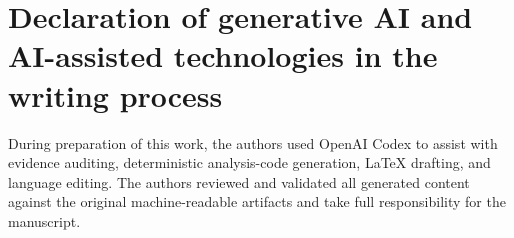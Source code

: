 \documentclass[preprint,12pt]{elsarticle}
\begin{document}
\section*{Declaration of generative AI and AI-assisted technologies in the writing process}
During preparation of this work, the authors used OpenAI Codex to assist with
evidence auditing, deterministic analysis-code generation, LaTeX drafting, and
language editing. The authors reviewed and validated all generated content
against the original machine-readable artifacts and take full responsibility
for the manuscript.



\end{document}
